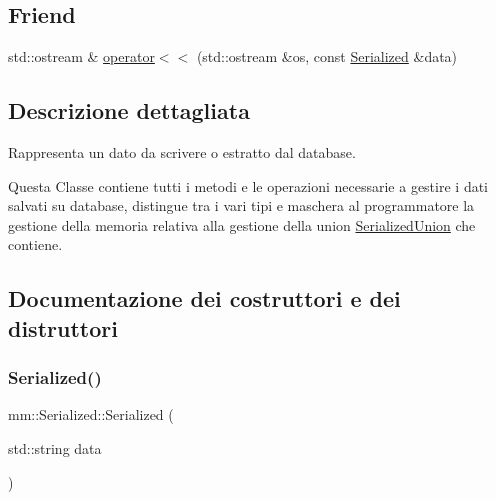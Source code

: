 \subsection*{Friend}
\begin{DoxyCompactItemize}
\item 
std\+::ostream \& \hyperlink{structmm_1_1_serialized_a7ac660741c58dec6ffe85a006b9846ae}{operator$<$$<$} (std\+::ostream \&os, const \hyperlink{structmm_1_1_serialized}{Serialized} \&data)
\end{DoxyCompactItemize}


\subsection{Descrizione dettagliata}
Rappresenta un dato da scrivere o estratto dal database. 

Questa Classe contiene tutti i metodi e le operazioni necessarie a gestire i dati salvati su database, distingue tra i vari tipi e maschera al programmatore la gestione della memoria relativa alla gestione della union \hyperlink{unionmm_1_1_serialized_union}{Serialized\+Union} che contiene. 

\subsection{Documentazione dei costruttori e dei distruttori}
\mbox{\label{structmm_1_1_serialized_a440d7e6daeb9e6c2ca286a2eee1fc24d}} 
\subsubsection{\texorpdfstring{Serialized()}{Serialized()}\hspace{0.1cm}{\footnotesize\ttfamily [1/7]}}
{\footnotesize\ttfamily mm\+::\+Serialized\+::\+Serialized (\begin{DoxyParamCaption}\item[{std\+::string}]{data }\end{DoxyParamCaption})\hspace{0.3cm}{\ttfamily [noexcept]}}

\mbox{\label{structmm_1_1_serialized_a1fcb5290740858b4a800f6b4d48e3c74}} 
